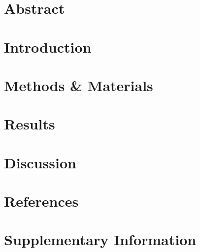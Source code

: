 \documentclass[11pt,a4paper]{article}
\begin{document}
	
	
	
	\newpage
	
	\section{Abstract}
	
	
	\newpage
	
	\section{Introduction}
	
	\newpage
	
	\section{Methods \& Materials}
	
	\newpage
	
	\section{Results}
	
	\newpage
	
	\section{Discussion}
	
	\newpage
	
	
	
	\newpage
	
	\section{References}
	
	\newpage
	
	\section{Supplementary Information}
	
	
	
	
	
	
\end{document}

